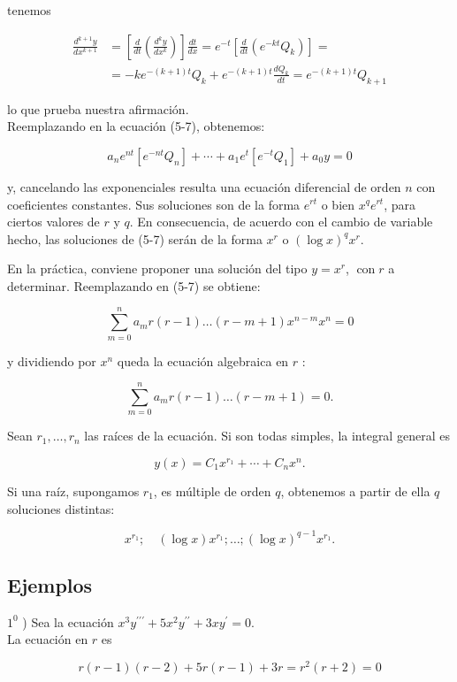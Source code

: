 \documentclass[10pt]{article}
\theoremstyle{plain}
\theoremstyle{definition}
\theoremstyle{remark}
\begin{document}
tenemos

$$
\begin{aligned}
\frac{d^{k+1} y}{d x^{k+1}} & =\left[\frac{d}{d t}\left(\frac{d^{k} y}{d x^{k}}\right)\right] \frac{d t}{d x}=e^{-t}\left[\frac{d}{d t}\left(e^{-k t} Q_{k}\right)\right]= \\
& =-k e^{-(k+1) t} Q_{k}+e^{-(k+1) t} \frac{d Q_{k}}{d t}=e^{-(k+1) t} Q_{k+1}
\end{aligned}
$$

lo que prueba nuestra afirmación.\\
Reemplazando en la ecuación (5-7), obtenemos:

$$
a_{n} e^{n t}\left[e^{-n t} Q_{n}\right]+\cdots+a_{1} e^{t}\left[e^{-t} Q_{1}\right]+a_{0} y=0
$$

y, cancelando las exponenciales resulta una ecuación diferencial de orden $n$ con coeficientes constantes. Sus soluciones son de la forma $e^{r t}$ o bien $x^{q} e^{r t}$, para ciertos valores de $r$ y $q$. En consecuencia, de acuerdo con el cambio de variable hecho, las soluciones de (5-7) serán de la forma $x^{r}$ o $(\log x)^{q} x^{r}$.

En la práctica, conviene proponer una solución del tipo $y=x^{r}$, $\operatorname{con} r$ a determinar. Reemplazando en (5-7) se obtiene:

$$
\sum_{m=0}^{n} a_{m} r(r-1) \ldots(r-m+1) x^{n-m} x^{n}=0
$$

y dividiendo por $x^{n}$ queda la ecuación algebraica en $r$ :

$$
\sum_{m=0}^{n} a_{m} r(r-1) \ldots(r-m+1)=0 .
$$

Sean $r_{1}, \ldots, r_{n}$ las raíces de la ecuación. Si son todas simples, la integral general es

$$
y(x)=C_{1} x^{r_{1}}+\cdots+C_{n} x^{n} .
$$


Si una raíz, supongamos $r_{1}$, es múltiple de orden $q$, obtenemos a partir de ella $q$ soluciones distintas:

$$
x^{r_{1}} ; \quad(\log x) x^{r_{1}} ; \ldots ;(\log x)^{q-1} x^{r_{1}} .
$$

\subsection{Ejemplos}
$1^{0}$ ) Sea la ecuación $x^{3} y^{\prime \prime \prime}+5 x^{2} y^{\prime \prime}+3 x y^{\prime}=0$.\\
La ecuación en $r$ es

$$
r(r-1)(r-2)+5 r(r-1)+3 r=r^{2}(r+2)=0
$$
\end{document}
